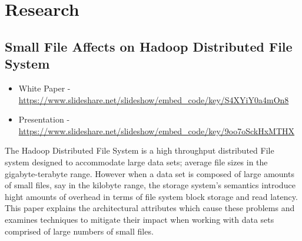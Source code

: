 \documentclass[12pt letterpaper notitlepage]{article}
\begin{document}
\section*{Research}
\label{sec-8}

\subsection*{Small File Affects on Hadoop Distributed File System}
\label{sec-8-1}

\begin{itemize}
\item White Paper - \url{https://www.slideshare.net/slideshow/embed_code/key/S4XYiY0a4mOn8}
\item Presentation - \url{https://www.slideshare.net/slideshow/embed_code/key/9oo7oSckHxMTHX}
\end{itemize}

The Hadoop Distributed File System is a high throughput distributed File system
designed to accommodate large data sets; average file sizes in the
gigabyte-terabyte range. However when a data set is composed of large amounts of
small files, say in the kilobyte range, the storage system's semantics introduce
hight amounts of overhead in terms of file system block storage and read
latency. This paper explains the architectural attributes which cause these
problems and examines techniques to mitigate their impact when working with data
sets comprised of large numbers of small files.
\end{document}
